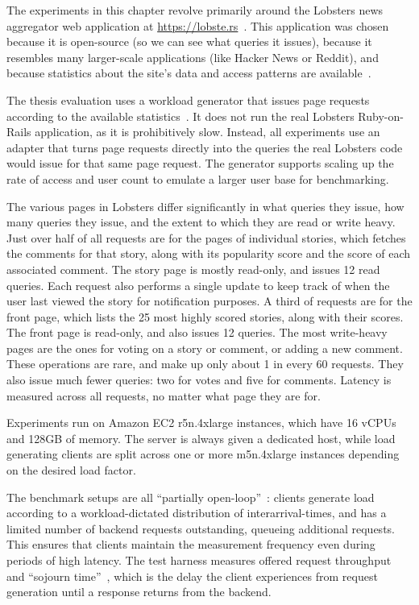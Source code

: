 The experiments in this chapter revolve primarily around the Lobsters news
aggregator web application at \url{https://lobste.rs}~\cite{lobsters}. This
application was chosen because it is open-source (so we can see what queries it
issues), because it resembles many larger-scale applications (like Hacker News
or Reddit), and because statistics about the site's data and access patterns are
available~\cite{lobsters-data}.

The thesis evaluation uses a workload generator that issues page requests
according to the available statistics~\cite{generator}. It does not run the
real Lobsters Ruby-on-Rails application, as it is prohibitively slow. Instead,
all experiments use an adapter that turns page requests directly into the
queries the real Lobsters code would issue for that same page request. The
generator supports scaling up the rate of access and user count to emulate a
larger user base for benchmarking.

The various pages in Lobsters differ significantly in what queries they issue,
how many queries they issue, and the extent to which they are read or write
heavy. Just over half of all requests are for the pages of individual stories,
which fetches the comments for that story, along with its popularity score and
the score of each associated comment. The story page is mostly read-only, and
issues 12 read queries. Each request also performs a single update to keep track
of when the user last viewed the story for notification purposes. A third of
requests are for the front page, which lists the 25 most highly scored stories,
along with their scores. The front page is read-only, and also issues 12
queries. The most write-heavy pages are the ones for voting on a story or
comment, or adding a new comment. These operations are rare, and make up only
about 1 in every 60 requests. They also issue much fewer queries: two for votes
and five for comments. Latency is measured across all requests, no matter what
page they are for.

Experiments run on Amazon EC2 r5n.4xlarge instances, which have 16 vCPUs and
128GB of memory. The server is always given a dedicated host, while load
generating clients are split across one or more m5n.4xlarge instances depending
on the desired load factor.

The benchmark setups are all ``partially open-loop''~\cite{frank-open-loop}:
clients generate load according to a workload-dictated distribution of
interarrival-times, and has a limited number of backend requests outstanding,
queueing additional requests. This ensures that clients maintain the measurement
frequency even during periods of high latency. The test harness measures offered
request throughput and ``sojourn time''~\cite{open-loop-cautionary-tale}, which
is the delay the client experiences from request generation until a response
returns from the backend.

